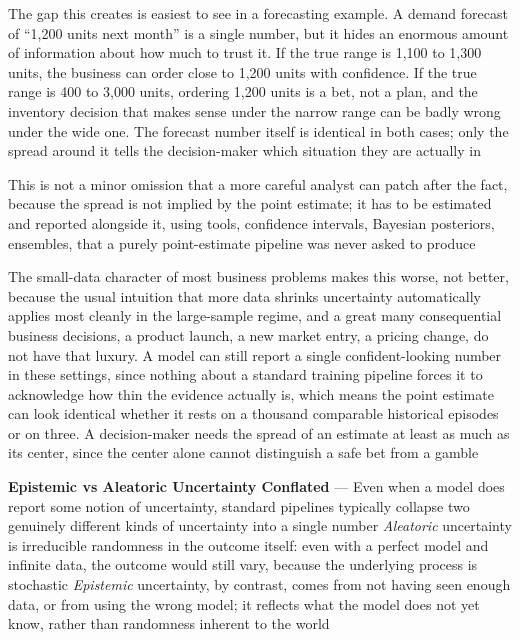 The gap this creates is easiest to see in a forecasting example. A demand forecast
of ``1,200 units next month'' is a single number, but it hides an enormous
amount of information about how much to trust it. If the true range is 1,100 to 1,300
units, the business can order close to 1,200 units with confidence. If the true range
is 400 to 3,000 units, ordering 1,200 units is a bet, not a plan, and the
inventory decision that makes sense under the narrow range can be badly wrong
under the wide one. The forecast number itself is identical in both cases; only
the spread around it tells the decision-maker which situation they are actually
in

This is not a minor omission that a more careful analyst can patch after the fact,
because the spread is not implied by the point estimate; it has to be estimated and
reported alongside it, using tools, confidence intervals, Bayesian posteriors, ensembles,
that a purely point-estimate pipeline was never asked to produce

The small-data character of most business problems makes this worse, not better,
because the usual intuition that more data shrinks uncertainty automatically applies
most cleanly in the large-sample regime, and a great many consequential business
decisions, a product launch, a new market entry, a pricing change, do not have
that luxury. A model can still report a single confident-looking number in these
settings, since nothing about a standard training pipeline forces it to
acknowledge how thin the evidence actually is, which means the point estimate can
look identical whether it rests on a thousand comparable historical episodes or on
three. A decision-maker needs the spread of an estimate at least as much as its
center, since the center alone cannot distinguish a safe bet from a gamble

\textbf{Epistemic vs Aleatoric Uncertainty Conflated} --- Even when a model does
report some notion of uncertainty, standard pipelines typically collapse two
genuinely different kinds of uncertainty into a single number \emph{Aleatoric} uncertainty
is irreducible randomness in the outcome itself: even with a perfect model and
infinite data, the outcome would still vary, because the underlying process is
stochastic \emph{Epistemic} uncertainty, by contrast, comes from not having seen
enough data, or from using the wrong model; it reflects what the model does not yet
know, rather than randomness inherent to the world

